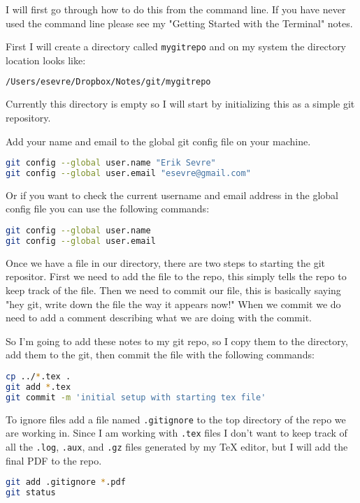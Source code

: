 \documentclass[a4paper]{spie} %
\begin{document}
I will first go through how to do this from the command line. If you have never used the command line please see my "Getting Started with the Terminal" notes.

First I will create a directory called \texttt{mygitrepo} and on my system the directory location looks like:
\begin{lstlisting}[language=bash]
/Users/esevre/Dropbox/Notes/git/mygitrepo
\end{lstlisting}

Currently this directory is empty so I will start by initializing this as a simple git repository.

Add your name and email to the global git config file on your machine.
\begin{lstlisting}[language=bash]
git config --global user.name "Erik Sevre"
git config --global user.email "esevre@gmail.com"
\end{lstlisting}

Or if you want to check the current username and email address in the global config file you can use the following commands:
\begin{lstlisting}[language=bash]
git config --global user.name
git config --global user.email
\end{lstlisting}



Once we have a file in our directory, there are two steps to starting the git repositor. First we need to add the file to the repo, this simply tells the repo to keep track of the file. Then we need to commit our file, this is basically saying "hey git, write down the file the way it appears now!" When we commit we do need to add a comment describing what we are doing with the commit.

So I'm going to add these notes to my git repo, so I copy them to the directory, add them to the git, then commit the file with the following commands:
\begin{lstlisting}[language=bash]
cp ../*.tex .
git add *.tex
git commit -m 'initial setup with starting tex file'
\end{lstlisting}



To ignore files add a file named \texttt{.gitignore} to the top directory of the repo we are working in. Since I am working with \texttt{.tex} files I don't want to keep track of all the \texttt{.log}, \texttt{.aux}, and \texttt{.gz} files generated by my TeX editor, but I will add the final PDF to the repo.
\begin{lstlisting}[language=bash]
git add .gitignore *.pdf
git status
\end{lstlisting}
\end{document}
